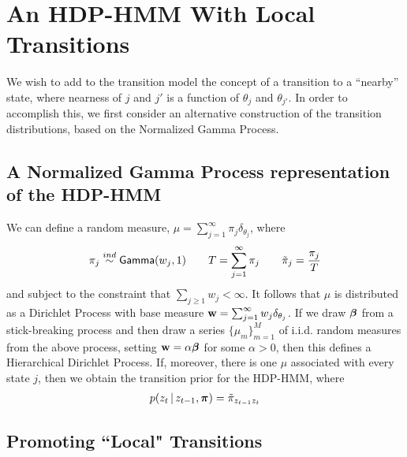 \section{An HDP-HMM With Local Transitions}
We wish to add to the transition model the concept of a transition to
a ``nearby'' state, where nearness of $j$ and $j'$ is a function of
$\theta_j$ and $\theta_{j'}$.  In order to accomplish this, we first
consider an alternative construction of the transition distributions,
based on the Normalized Gamma Process.

\subsection{A Normalized Gamma Process representation of the HDP-HMM}
\label{sec:normalized-gamma}

We can define a random measure, $\mu = \sum_{j=1}^{\infty} \pi_j \delta_{\theta_j}$, where 
\begin{align}
  \pi_j \stackrel{ind}{\sim} \mathsf{Gamma}(w_j,1) \qquad T =
  \sum_{j=1}^{\infty} \pi_j \qquad
  \tilde{\pi}_j = \frac{\pi_j}{T} \label{eq:20}
\end{align}
and subject to the constraint that $\sum_{j\geq 1} w_j < \infty$.  It
follows \cite{paisley2012discrete} that $\mu$ is distributed as a Dirichlet
Process with base measure $\mathbf{w} = \sum_{j=1}^{\infty} w_j \delta_{\theta_j}$.
If we draw $\boldsymbol{\beta}$ from a stick-breaking process and then draw a
series $\{\mu_m\}_{m=1}^M$ of
i.i.d. random measures from the above process, setting $\mathbf{w} =
\alpha\boldsymbol{\beta}$ for some $\alpha > 0$, then
this defines a Hierarchical Dirichlet Process.  If, moreover, there is
one $\mu$ associated with every state $j$, then we obtain the
transition prior for the HDP-HMM, where
\begin{align}
  \label{eq:50}
  p(z_t \, \vert \, z_{t-1}, \boldsymbol{\pi}) = \tilde{\pi}_{z_{t-1}z_t}
\end{align}

\subsection{Promoting ``Local" Transitions}
\label{sec:prom-local-trans}

